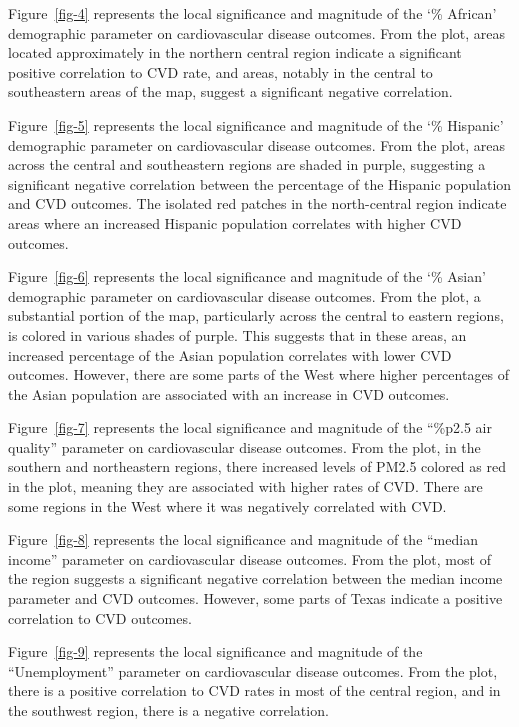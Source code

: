 \documentclass[
]{article}
\begin{document}
Figure~\ref{fig-4} represents the local significance and magnitude of
the `\% African' demographic parameter on cardiovascular disease
outcomes. From the plot, areas located approximately in the northern
central region indicate a significant positive correlation to CVD rate,
and areas, notably in the central to southeastern areas of the map,
suggest a significant negative correlation.

Figure~\ref{fig-5} represents the local significance and magnitude of
the `\% Hispanic' demographic parameter on cardiovascular disease
outcomes. From the plot, areas across the central and southeastern
regions are shaded in purple, suggesting a significant negative
correlation between the percentage of the Hispanic population and CVD
outcomes. The isolated red patches in the north-central region indicate
areas where an increased Hispanic population correlates with higher CVD
outcomes.~

Figure~\ref{fig-6} represents the local significance and magnitude of
the `\% Asian' demographic parameter on cardiovascular disease outcomes.
From the plot, a substantial portion of the map, particularly across the
central to eastern regions, is colored in various shades of purple. This
suggests that in these areas, an increased percentage of the Asian
population correlates with lower CVD outcomes. However, there are some
parts of the West where higher percentages of the Asian population are
associated with an increase in CVD outcomes.~

Figure~\ref{fig-7} represents the local significance and magnitude of
the ``\%p2.5 air quality'' parameter on cardiovascular disease outcomes.
From the plot, in the southern and northeastern regions, there increased
levels of PM2.5 colored as red in the plot, meaning they are associated
with higher rates of CVD. There are some regions in the West where it
was negatively correlated with CVD.

Figure~\ref{fig-8} represents the local significance and magnitude of
the ``median income'' parameter on cardiovascular disease outcomes. From
the plot, most of the region suggests a significant negative correlation
between the median income parameter and CVD outcomes. However, some
parts of Texas indicate a positive correlation to CVD outcomes.~

Figure~\ref{fig-9} represents the local significance and magnitude of
the ``Unemployment'' parameter on cardiovascular disease outcomes. From
the plot, there is a positive correlation to CVD rates in most of the
central region, and in the southwest region, there is a negative
correlation.
\end{document}
